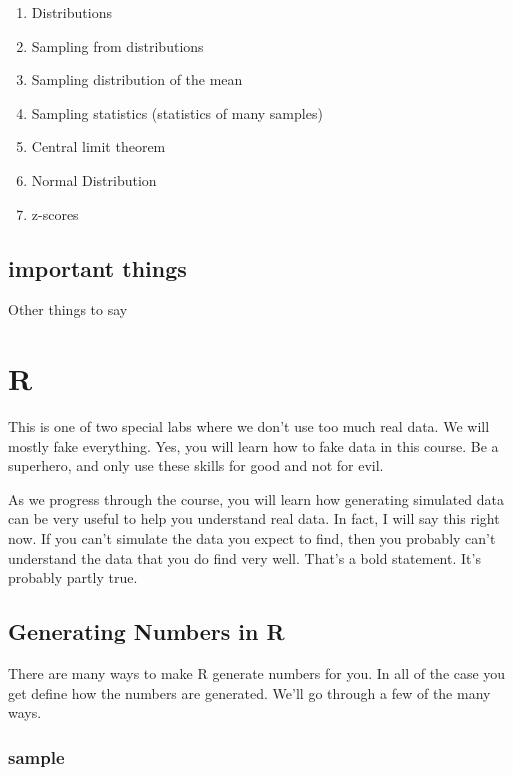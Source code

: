 \documentclass[]{book}
\providecommand{\tightlist}{%
  \setlength{\itemsep}{0pt}\setlength{\parskip}{0pt}}
\theoremstyle{definition}
\theoremstyle{definition}
\theoremstyle{definition}
\theoremstyle{remark}
\begin{document}
\begin{enumerate}
\def\labelenumi{\arabic{enumi}.}
\tightlist
\item
  Distributions
\item
  Sampling from distributions
\item
  Sampling distribution of the mean
\item
  Sampling statistics (statistics of many samples)
\item
  Central limit theorem
\item
  Normal Distribution
\item
  z-scores
\end{enumerate}

\subsection{important things}\label{important-things-2}

Other things to say

\section{R}\label{r-4}

This is one of two special labs where we don't use too much real data.
We will mostly fake everything. Yes, you will learn how to fake data in
this course. Be a superhero, and only use these skills for good and not
for evil.

As we progress through the course, you will learn how generating
simulated data can be very useful to help you understand real data. In
fact, I will say this right now. If you can't simulate the data you
expect to find, then you probably can't understand the data that you do
find very well. That's a bold statement. It's probably partly true.

\subsection{Generating Numbers in R}\label{generating-numbers-in-r}

There are many ways to make R generate numbers for you. In all of the
case you get define how the numbers are generated. We'll go through a
few of the many ways.

\subsubsection{sample}\label{sample}
\end{document}
